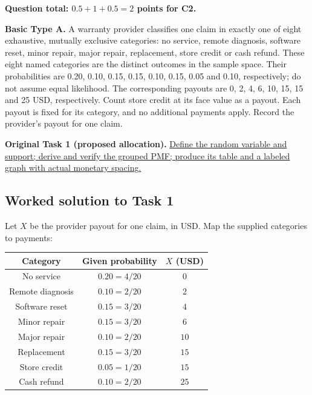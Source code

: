 \par\vspace{3mm}\secInicio[][sec:q3]

\textbf{Question total: $0.5+1+0.5=2$ points for C2.}

\clearpage
{}

\textbf{Basic Type A.} A warranty provider classifies one claim in exactly one of eight exhaustive, mutually exclusive categories: no service, remote diagnosis, software reset, minor repair, major repair, replacement, store credit or cash refund. These eight named categories are the distinct outcomes in the sample space. Their probabilities are 0.20, 0.10, 0.15, 0.15, 0.10, 0.15, 0.05 and 0.10, respectively; do not assume equal likelihood. The corresponding payouts are 0, 2, 4, 6, 10, 15, 15 and 25 USD, respectively. Count store credit at its face value as a payout. Each payout is fixed for its category, and no additional payments apply. Record the provider's payout for one claim.

\textbf{Original Task 1 (proposed allocation).} \hyperref[sol:q4t1]{Define the random variable and support; derive and verify the grouped PMF; produce its table and a labeled graph with actual monetary spacing.} 


\subsection*{Worked solution to Task 1 }
\label{sol:q4t1}

Let $X$ be the provider payout for one claim, in USD. Map the supplied categories to payments:

\begin{center}
\begin{tabular}{ccc}\toprule
Category & Given probability & $X$ (USD)\\\midrule
No service & $0.20=4/20$ & $0$\\
Remote diagnosis & $0.10=2/20$ & $2$\\
Software reset & $0.15=3/20$ & $4$\\
Minor repair & $0.15=3/20$ & $6$\\
Major repair & $0.10=2/20$ & $10$\\
Replacement & $0.15=3/20$ & $15$\\
Store credit & $0.05=1/20$ & $15$\\
Cash refund & $0.10=2/20$ & $25$\\
\bottomrule\end{tabular}
\end{center}


